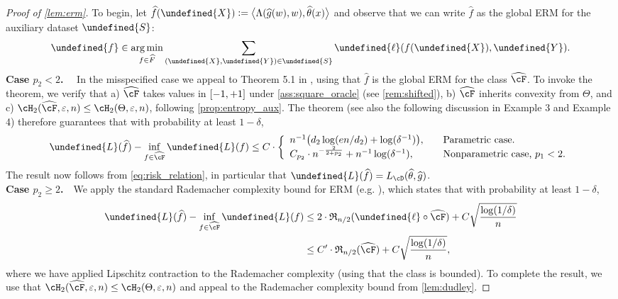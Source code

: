 \documentclass[11pt]{article} %
\newcommand{\pref}[1]{\cref{#1}}
\newcommand{\pfref}[1]{Proof of \pref{#1}}
\theoremstyle{theorem}  %
\theoremstyle{plain}
\DeclarePairedDelimiter{\brk}{[}{]}
\DeclarePairedDelimiter{\prn}{(}{)}
\DeclarePairedDelimiter{\tri}{\langle}{\rangle}
\DeclareMathOperator*{\argmin}{arg\,min} %
\newcommand{\ls}{\ell}
\newcommand{\veps}{\varepsilon}
\newcommand{\ldef}{\vcentcolon=}
\newcommand{\wt}[1]{\widetilde{#1}}
\newcommand{\wh}[1]{\widehat{#1}}
\let\wt\undefined
\newcommand{\wt}[1]{\widetilde{#1}}
\newcommand{\unitrange}{\brk*{-1,+1}}
\newcommand{\poprisk}{L_{\cD}}
\newcommand{\auxX}{\wt{X}}
\newcommand{\auxY}{\wt{Y}}
\newcommand{\auxS}{\wt{S}}
\newcommand{\auxL}{\wt{L}}
\newcommand{\estone}{\wh{g}}
\newcommand{\esttwo}{\wh{\theta}}
\newcommand{\pone}{p_1}
\newcommand{\ptwo}{p_2}
\newcommand{\dtwo}{d_2}
\newcommand{\target}{\Theta}
\begin{document}
\begin{proof}[\pfref{lem:erm}] To begin, let
  $\wh{f}(\auxX)\ldef{}\tri[\big]{\Lambda(\estone(w),w),\esttwo(x)}$
  and observe that we can write $\wh{f}$ as the global ERM for the auxiliary dataset $\wt{S}$:
\[
\wt{f}\in\argmin_{f\in\wh{F}}\sum_{(\auxX,\auxY)\in\auxS}\wt{\ls}(f(\auxX),\auxY).
\]
\noindent\textbf{Case $\ptwo<2$.}~~ In the misspecified case we appeal to Theorem 5.1 in \cite{koltchinskii2011introduction}, using that $\wh{f}$ is the global ERM for the class $\wh{\cF}$. To invoke the theorem, we verify that a) $\wh{\cF}$ takes values in $\unitrange$ under \pref{ass:square_oracle} (see \pref{rem:shifted}), b) $\wh{\cF}$ inherits convexity from $\target$, and c) $\cH_2(\wh{\cF},\veps,n)\leq{}\cH_{2}(\target,\veps,n)$, following \pref{prop:entropy_aux}. The theorem (see also the following discussion in Example 3 and Example 4) therefore guarantees that with probability at least $1-\delta$,
\begin{align*}
\auxL(\wh{f}) -\inf_{f\in\wh{\cF}}\auxL(f) \leq C\cdot\left\{
\begin{array}{ll}
n^{-1}\prn*{\dtwo\log(en/\dtwo) + \log(\delta^{-1})},\quad&\text{Parametric case.}\\
C_{\ptwo}\cdot{}n^{-\frac{2}{2+\ptwo}} + n^{-1}\log(\delta^{-1}),\quad&\text{Nonparametric case, $\pone<2$.}
\end{array}
\right.
\end{align*}
The result now follows from \pref{eq:risk_relation}, in particular that $\auxL(\wh{f})=\poprisk(\esttwo,\estone)$.\\

\noindent\textbf{Case $\ptwo\geq2$.}~~We apply the standard Rademacher complexity bound for ERM (e.g. \cite{shalev2014understanding}), which states that with probability at least $1-\delta$,
\begin{align*}
\auxL(\wh{f}) -\inf_{f\in\wh{\cF}}\auxL(f) &\leq{} 2\cdot\mathfrak{R}_{n/2}(\wt{\ls}\circ\wh{\cF}) + C\sqrt{\frac{\log(1/\delta)}{n}}\\
&\leq{} C'\cdot\mathfrak{R}_{n/2}(\wh{\cF}) + C\sqrt{\frac{\log(1/\delta)}{n}},
\end{align*}
where we have applied Lipschitz contraction to the Rademacher complexity (using that the class is bounded). To complete the result, we use that $\cH_2(\wh{\cF},\veps,n)\leq{}\cH_{2}(\target,\veps,n)$ and appeal to the Rademacher complexity bound from \pref{lem:dudley}.
\end{proof}
\end{document}
